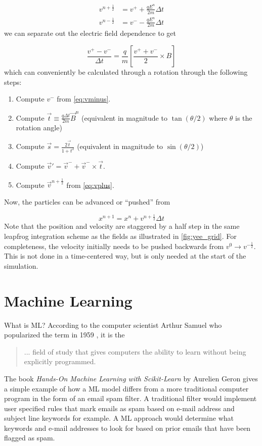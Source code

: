 \begin{align}
	v^{n + \frac{1}{2}} &= v^+ + \frac{q E^n}{2 m} \Delta t \label{eq:vplus} \\
	v^{n - \frac{1}{2}} &= v^- - \frac{q E^n}{2 m} \Delta t \label{eq:vminus}
\end{align}
we can separate out the electric field dependence to get 

\begin{equation}
	\frac{v^+ - v^-}{\Delta t} = \frac{q}{m}[\frac{v^+ + v^-}{2} \times B]
\end{equation}
which can conveniently be calculated through a rotation \cite{Birdsall_2004_PIC} through the following steps:

\begin{enumerate}
	\item Compute $v^-$ from \autoref{eq:vminus}.
	\item Compute $\vec{t} \equiv \frac{q \Delta t}{2 m} \vec{B}^n $ (equivalent in magnitude to $\tan(\theta/2)$ where $\theta$ is the rotation angle)
	\item Compute $\vec{s} = \frac{2 \vec{t}}{1 + t^2}$ (equivalent in magnitude to $\sin(\theta/2)$)
	\item Compute $\vec{v}' = \vec{v}^- + \vec{v}^- \times \vec{t}$.
	\item Compute $\vec{v}^{n+\frac{1}{2}}$ from \autoref{eq:vplus}.
\end{enumerate}
Now, the particles can be advanced or ``pushed'' from

\begin{equation}
	x^{n+1} = x^{n} + v^{n+\frac{1}{2}} \Delta t \label{eq:particlepush}
\end{equation}
Note that the position and velocity are staggered by a half step in the same leapfrog integration scheme as the fields as illustrated in \autoref{fig:yee_grid}. For completeness, the velocity initially needs to be pushed backwards from $v^{0} \rightarrow v^{-\frac{1}{2}}$. This is not done in a time-centered way, but is only needed at the start of the simulation. 

\section{Machine Learning}
What is \gls{ML}? According to the computer scientist Arthur Samuel who popularized the term in 1959 \cite{Geron_2023_ML}, it is the 

\begin{quote}
	... field of study that gives computers the ability to learn without being explicitly programmed. 
\end{quote}
The book \emph{Hands-On Machine Learning with Scikit-Learn} by Aurelien Geron \cite{Geron_2023_ML} gives a simple example of how a \gls{ML} model differs from a more traditional computer program in the form of an email spam filter. A traditional filter would implement user specified rules that mark emails as spam based on e-mail address and subject line keywords for example. A \gls{ML} approach would determine what keywords and e-mail addresses to look for based on prior emails that have been flagged as spam.


